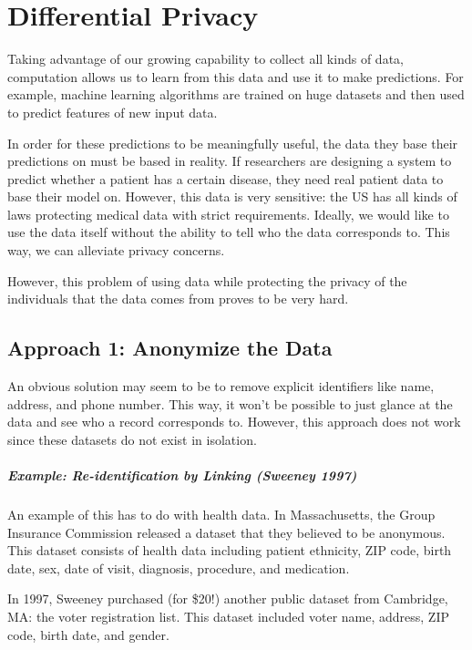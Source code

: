 \chapter{Differential Privacy}

Taking advantage of our growing capability to collect all kinds of data, computation allows us to learn from this data and use it to make predictions. For example, machine learning algorithms are trained on huge datasets and then used to predict features of new input data. 

In order for these predictions to be meaningfully useful, the data they base their predictions on must be based in reality. If researchers are designing a system to predict whether a patient has a certain disease, they need real patient data to base their model on. However, this data is very sensitive: the US has all kinds of laws protecting medical data with strict requirements. Ideally, we would like to use the data itself without the ability to tell who the data corresponds to. This way, we can alleviate privacy concerns.

However, this problem of using data while protecting the privacy of the individuals that the data comes from proves to be very hard.

\section{Approach 1: Anonymize the Data}
An obvious solution may seem to be to remove explicit identifiers like name, address, and phone number. This way, it won't be possible to just glance at the data and see who a record corresponds to. However, this approach does not work since these datasets do not exist in isolation. 

\paragraph{Example: Re-identification by Linking (Sweeney 1997)}
An example of this has to do with health data. In Massachusetts, the Group Insurance Commission released a dataset that they believed to be anonymous. This dataset consists of health data including patient ethnicity, ZIP code, birth date, sex, date of visit, diagnosis, procedure, and medication.

In 1997, Sweeney purchased (for \$20!) another public dataset from Cambridge, MA: the voter registration list. This dataset included voter name, address, ZIP code, birth date, and gender.

